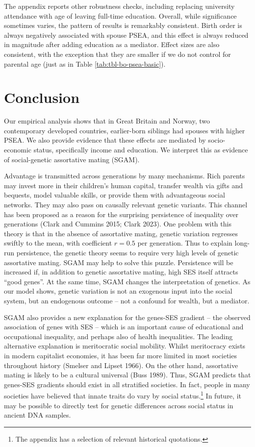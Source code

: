 \documentclass[
  12pt,
]{article}
\theoremstyle{definition}
\theoremstyle{definition}
\theoremstyle{definition}
\theoremstyle{definition}
\theoremstyle{remark}
\begin{document}
The appendix reports other robustness checks, including replacing university
attendance with age of leaving full-time education. Overall, while significance
sometimes varies, the pattern of results is remarkably consistent. Birth order is
always negatively associated with spouse PSEA, and this effect is always reduced
in magnitude after adding education as a mediator. Effect sizes are also
consistent, with the exception that they are smaller if we do not control for
parental age (just as in Table \ref{tab:tbl-bo-psea-basic}).

\hypertarget{conclusion}{%
\section{Conclusion}\label{conclusion}}

Our empirical analysis shows that in Great Britain and Norway, two contemporary
developed countries, earlier-born siblings had spouses with
higher PSEA. We also provide evidence that these effects are mediated by
socio-economic status, specifically income and education. We interpret this as
evidence of social-genetic assortative mating (SGAM).

Advantage is transmitted across generations by many mechanisms. Rich parents may
invest more in their children's human capital, transfer wealth via gifts and
bequests, model valuable skills, or provide them with advantageous social
networks. They may also pass on causally relevant genetic variants. This channel
has been proposed as a reason for the surprising persistence of inequality over
generations (Clark and Cummins 2015; Clark 2023). One problem
with this theory is that in the absence of assortative mating, genetic variation
regresses swiftly to the mean, with coefficient \(r = 0.5\) per generation. Thus
to explain long-run persistence, the genetic theory seems to require very high
levels of genetic assortative mating. SGAM may help to solve this puzzle.
Persistence will be increased if, in addition to genetic assortative mating,
high SES itself attracts ``good genes''. At the same time, SGAM changes the
interpretation of genetics. As our model shows, genetic variation is not an
exogenous input into the social system, but an endogenous outcome -- not a
confound for wealth, but a mediator.

SGAM also provides a new explanation for the genes-SES gradient -- the observed
association of genes with SES -- which is an important cause of educational
and occupational inequality, and perhaps also of health inequalities. The
leading alternative explanation is meritocratic social mobility. Whilst
meritocracy exists in modern capitalist economies, it has been far more limited
in most societies throughout history (Smelser and Lipset 1966). On the other hand,
assortative mating is likely to be a cultural universal (Buss 1989). Thus,
SGAM predicts that genes-SES gradients should exist in all stratified societies.
In fact, people in many societies have believed that innate traits do vary by
social status.\footnote{The appendix has a selection of relevant historical quotations.} In future, it may be possible to directly test for
genetic differences across social status in ancient DNA samples.
\end{document}
